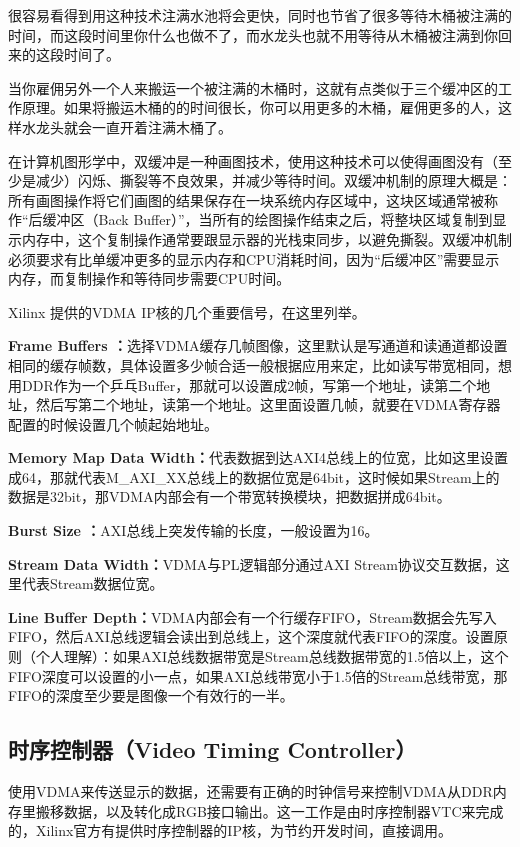\documentclass[supercite]{HustGraduPaper}
\begin{document}
	很容易看得到用这种技术注满水池将会更快，同时也节省了很多等待木桶被注满的时间，而这段时间里你什么也做不了，而水龙头也就不用等待从木桶被注满到你回来的这段时间了。
	
	当你雇佣另外一个人来搬运一个被注满的木桶时，这就有点类似于三个缓冲区的工作原理。如果将搬运木桶的的时间很长，你可以用更多的木桶，雇佣更多的人，这样水龙头就会一直开着注满木桶了。
	
	在计算机图形学中，双缓冲是一种画图技术，使用这种技术可以使得画图没有（至少是减少）闪烁、撕裂等不良效果，并减少等待时间。双缓冲机制的原理大概是：所有画图操作将它们画图的结果保存在一块系统内存区域中，这块区域通常被称作“后缓冲区（Back Buffer）”，当所有的绘图操作结束之后，将整块区域复制到显示内存中，这个复制操作通常要跟显示器的光栈束同步，以避免撕裂。双缓冲机制必须要求有比单缓冲更多的显示内存和CPU消耗时间，因为“后缓冲区”需要显示内存，而复制操作和等待同步需要CPU时间。
	
	Xilinx 提供的VDMA IP核的几个重要信号，在这里列举。
	
	{\songti \bfseries Frame Buffers ：}选择VDMA缓存几帧图像，这里默认是写通道和读通道都设置相同的缓存帧数，具体设置多少帧合适一般根据应用来定，比如读写带宽相同，想用DDR作为一个乒乓Buffer，那就可以设置成2帧，写第一个地址，读第二个地址，然后写第二个地址，读第一个地址。这里面设置几帧，就要在VDMA寄存器配置的时候设置几个帧起始地址。 
	
	{\songti \bfseries Memory Map Data Width：}代表数据到达AXI4总线上的位宽，比如这里设置成64，那就代表M\_AXI\_XX总线上的数据位宽是64bit，这时候如果Stream上的数据是32bit，那VDMA内部会有一个带宽转换模块，把数据拼成64bit。 
	
	{\songti \bfseries Burst Size ：}AXI总线上突发传输的长度，一般设置为16。
	
	{\songti \bfseries Stream Data Width：}VDMA与PL逻辑部分通过AXI Stream协议交互数据，这里代表Stream数据位宽。
	
	{\songti \bfseries Line Buffer Depth：}VDMA内部会有一个行缓存FIFO，Stream数据会先写入FIFO，然后AXI总线逻辑会读出到总线上，这个深度就代表FIFO的深度。设置原则（个人理解）：如果AXI总线数据带宽是Stream总线数据带宽的1.5倍以上，这个FIFO深度可以设置的小一点，如果AXI总线带宽小于1.5倍的Stream总线带宽，那FIFO的深度至少要是图像一个有效行的一半。 
	
	\subsection{时序控制器（Video Timing Controller）}
	使用VDMA来传送显示的数据，还需要有正确的时钟信号来控制VDMA从DDR内存里搬移数据，以及转化成RGB接口输出。这一工作是由时序控制器VTC来完成的，Xilinx官方有提供时序控制器的IP核，为节约开发时间，直接调用。
	
\end{document}
